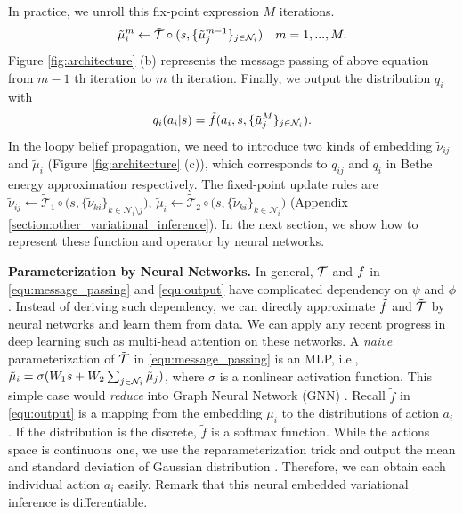 \documentclass[11pt,a4paper]{article}
\theoremstyle{definition}
\begin{document}
In practice, we unroll this fix-point expression $M$ iterations.
\begin{equation}\label{equ:message_passing}
\Tilde{\mu}^{m}_{i}\leftarrow \Tilde{\mathcal{T}}\circ (s, \{\Tilde{\mu}^{m-1}_j\}_{j\in \mathcal{N}_i}) \quad m=1,...,M.
\end{equation}
Figure \ref{fig:architecture} (b) represents the message passing of above equation from $m-1$ th iteration  to $m$ th iteration. Finally, we output the distribution $q_i$ with
\begin{equation}\label{equ:output}
q_i(a_i|s)=\Tilde{f}(a_i,s,\{\Tilde{\mu}^{M}_j\}_{j\in{\mathcal{N}_i}}).
\end{equation}
In the loopy belief propagation, we need to introduce two kinds of embedding $\tilde{\nu}_{ij}$ and $\tilde{\mu}_i$ (Figure \ref{fig:architecture} (c)), which corresponds to $q_{ij}$ and $q_i$ in Bethe energy approximation respectively. The fixed-point update rules are $\tilde{\nu}_{ij} \leftarrow\tilde{\mathcal{T}}_1\circ \big( s, \{ \tilde{\nu}_{ki}\}_{k\in \mathcal{N}_i \setminus j}  \big)$,
$ \tilde{\mu}_i \leftarrow \tilde{\mathcal{T}}_2\circ \big( s, \{\tilde{\nu}_{ki}\}_{k\in \mathcal{N}_i} \big)$ (Appendix \ref{section:other_variational_inference}). In the next section, we show how to represent these function and operator by neural networks.


{\bf Parameterization by  Neural Networks.} In general, $\Tilde{\mathcal{T}}$ and $\Tilde{f}$ in  \eqref{equ:message_passing} and \eqref{equ:output} have complicated dependency on $\psi$ and $\phi$. Instead of deriving such dependency, we can directly approximate $\Tilde{f}$ and $\Tilde{\mathcal{T}}$ by neural networks and learn them from data. We can apply  any recent progress in deep learning such as multi-head attention \citep{vaswani2017attention}  on these networks. A \emph{naive} parameterization of $\Tilde{\mathcal{T}}$ in \eqref{equ:message_passing} is an MLP, i.e., $\Tilde{\mu}_i=\sigma(W_1s+W_2\sum_{j\in \mathcal{N}_i}\Tilde{\mu}_j) $, where $\sigma$ is a nonlinear activation function.  This simple case would \emph{reduce} into Graph Neural Network (GNN) \citep{hamilton2017inductive}. Recall $\tilde{f}$  in \eqref{equ:output} is a mapping from the embedding $\mu_i$ to the distributions of action $a_i$. If the distribution is the discrete, $\tilde{f}$ is a softmax function. While the actions space is continuous one, we use the reparameterization trick and output the mean and standard deviation of Gaussian distribution \cite{kingma2013auto}. Therefore, we can obtain each individual action $a_i$ easily.   Remark that this neural embedded variational inference is differentiable.
\end{document}
